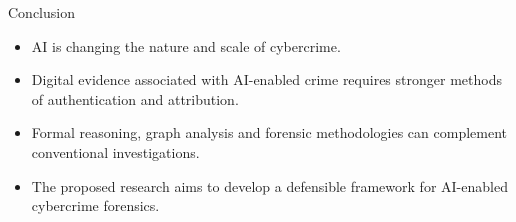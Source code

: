 \documentclass[aspectratio=169,11pt]{beamer}
\begin{document}
	\begin{frame}{Conclusion}
		
		\begin{itemize}
			
			\item AI is changing the nature and scale of cybercrime.
			
			\vspace{0.25cm}
			
			\item Digital evidence associated with AI-enabled crime
			requires stronger methods of authentication and attribution.
			
			\vspace{0.25cm}
			
			\item Formal reasoning, graph analysis and forensic
			methodologies can complement conventional investigations.
			
			\vspace{0.25cm}
			
			\item The proposed research aims to develop a defensible
			framework for AI-enabled cybercrime forensics.
			
		\end{itemize}
		
		\vspace{0.5cm}
		
		\begin{center}
			
			
		\end{center}
		
	\end{frame}
	
	
\end{document}
